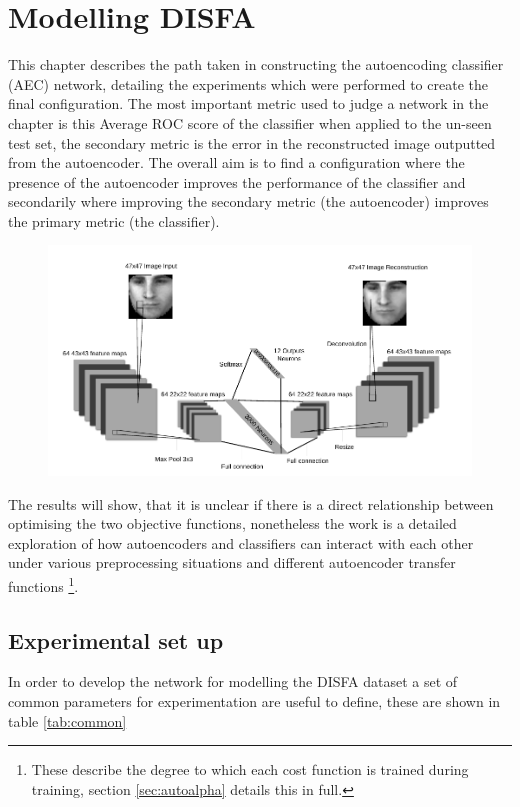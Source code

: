 \chapter{Modelling DISFA} \label{sec:model}
  This chapter describes the path taken in constructing the autoencoding classifier (AEC) network, detailing
  the experiments which were performed to create the final configuration.
  The most important metric used to judge a network in the chapter is this Average ROC score of the classifier
  when applied to the un-seen test set, the secondary metric is the error
  in the reconstructed image outputted from the autoencoder. The overall aim is to
  find a configuration where the presence of the autoencoder improves
  the performance of the classifier and secondarily where improving the secondary metric (the autoencoder) improves
  the primary metric (the classifier).

  \begin{figure}[h!]
   \centering
   \includegraphics[width=\textwidth]{illustrations/aec_network.pdf}
  \end{figure}

  The results will show, that it is unclear if there is a direct relationship between optimising the two objective functions, nonetheless
  the work is a detailed exploration of how autoencoders and classifiers can interact with each other
  under various preprocessing situations and different autoencoder transfer functions \footnote{These describe the degree to which
  each cost function is trained during training, section \ref{sec:autoalpha} details this in full.}.

  \section{Experimental set up}
    In order to develop the network for modelling the DISFA dataset a set of common
    parameters for experimentation are useful to define, these are shown in table \ref{tab:common}

